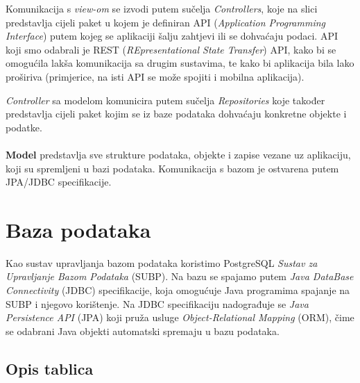 		Komunikacija s \textit{view-om} se izvodi putem sučelja \textit{Controllers}, koje na slici predstavlja cijeli paket u kojem je definiran API (\textit{Application Programming Interface}) putem kojeg se aplikaciji šalju zahtjevi ili se dohvaćaju podaci. API koji smo odabrali je REST (\textit{REpresentational State Transfer}) API, kako bi se omogućila lakša komunikacija sa drugim sustavima, te kako bi aplikacija bila lako proširiva (primjerice, na isti API se može spojiti i mobilna aplikacija).
		 
		\textit{Controller} sa modelom komunicira putem sučelja \textit{Repositories} koje također predstavlja cijeli paket kojim se iz baze podataka dohvaćaju konkretne objekte i podatke.\\
		\\
		\textbf{Model} predstavlja sve strukture podataka, objekte i zapise vezane uz aplikaciju, koji su spremljeni u bazi podataka. Komunikacija s bazom je ostvarena putem JPA/JDBC specifikacije.

	
		\section{Baza podataka}
			
			Kao sustav upravljanja bazom podataka koristimo PostgreSQL \textit{Sustav za Upravljanje Bazom Podataka} (SUBP). Na bazu se spajamo putem \textit{Java DataBase Connectivity} (JDBC) specifikacije, koja omogućuje Java programima spajanje na SUBP i njegovo korištenje. Na JDBC specifikaciju nadograđuje se \textit{Java Persistence API} (JPA) koji pruža usluge \textit{Object-Relational Mapping} (ORM), čime se odabrani Java objekti automatski spremaju u bazu podataka.
		
			\subsection{Opis tablica}
			
